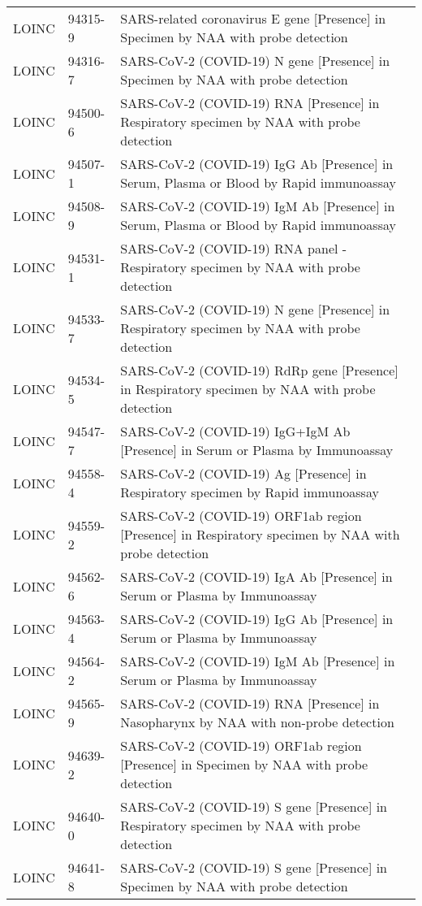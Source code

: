 \begin{table}[ht]
\begin{tabular}{lll}
  LOINC & 94315-9 & SARS-related coronavirus E gene [Presence] in Specimen by NAA with probe detection \\ 
  LOINC & 94316-7 & SARS-CoV-2 (COVID-19) N gene [Presence] in Specimen by NAA with probe detection \\ 
  LOINC & 94500-6 & SARS-CoV-2 (COVID-19) RNA [Presence] in Respiratory specimen by NAA with probe detection \\ 
  LOINC & 94507-1 & SARS-CoV-2 (COVID-19) IgG Ab [Presence] in Serum, Plasma or Blood by Rapid immunoassay \\ 
  LOINC & 94508-9 & SARS-CoV-2 (COVID-19) IgM Ab [Presence] in Serum, Plasma or Blood by Rapid immunoassay \\ 
  LOINC & 94531-1 & SARS-CoV-2 (COVID-19) RNA panel - Respiratory specimen by NAA with probe detection \\ 
  LOINC & 94533-7 & SARS-CoV-2 (COVID-19) N gene [Presence] in Respiratory specimen by NAA with probe detection \\ 
  LOINC & 94534-5 & SARS-CoV-2 (COVID-19) RdRp gene [Presence] in Respiratory specimen by NAA with probe detection \\ 
  LOINC & 94547-7 & SARS-CoV-2 (COVID-19) IgG+IgM Ab [Presence] in Serum or Plasma by Immunoassay \\ 
  LOINC & 94558-4 & SARS-CoV-2 (COVID-19) Ag [Presence] in Respiratory specimen by Rapid immunoassay \\ 
  LOINC & 94559-2 & SARS-CoV-2 (COVID-19) ORF1ab region [Presence] in Respiratory specimen by NAA with probe detection \\ 
  LOINC & 94562-6 & SARS-CoV-2 (COVID-19) IgA Ab [Presence] in Serum or Plasma by Immunoassay \\ 
  LOINC & 94563-4 & SARS-CoV-2 (COVID-19) IgG Ab [Presence] in Serum or Plasma by Immunoassay \\ 
  LOINC & 94564-2 & SARS-CoV-2 (COVID-19) IgM Ab [Presence] in Serum or Plasma by Immunoassay \\ 
  LOINC & 94565-9 & SARS-CoV-2 (COVID-19) RNA [Presence] in Nasopharynx by NAA with non-probe detection \\ 
  LOINC & 94639-2 & SARS-CoV-2 (COVID-19) ORF1ab region [Presence] in Specimen by NAA with probe detection \\ 
  LOINC & 94640-0 & SARS-CoV-2 (COVID-19) S gene [Presence] in Respiratory specimen by NAA with probe detection \\ 
  LOINC & 94641-8 & SARS-CoV-2 (COVID-19) S gene [Presence] in Specimen by NAA with probe detection \\ 

\end{tabular}
\end{table}
